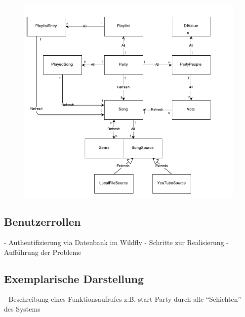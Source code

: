 \begin{figure}[H]
\centering
\includegraphics[width=1\linewidth]{Bilder/EntityBeansModelMitCascading}
\caption{}
\label{fig:EntityBeansModelMitCascading}
\end{figure}


\subsection{Benutzerrollen}

- Authentifizierung via Datenbank im Wildfly
- Schritte zur Realisierung
- Aufführung der Probleme


\subsection{Exemplarische Darstellung}

- Beschreibung eines Funktionsaufrufes z.B. start Party durch alle "`Schichten"' des Systems



